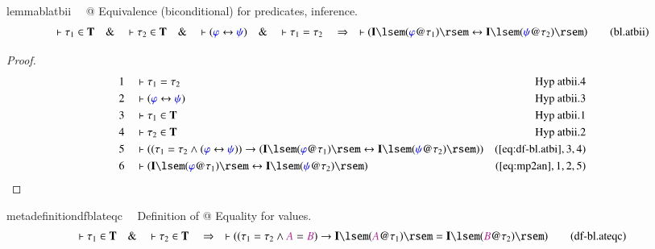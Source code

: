 \begin{restatable}{lemma}{blatbii}~~ @ Equivalence (biconditional) for
predicates, inference.
\begin{align}
\vdash \tau_1 \in \mathbf{T}\quad\&\quad \vdash \tau_2 \in
    \mathbf{T}\quad\&\quad \vdash ( \mw{\varphi} \leftrightarrow \mw{\psi}
    )\quad\&\quad \vdash \tau_1 = \tau_2\quad\Rightarrow\quad \vdash (
    \mathbf{I} \lsem ( \mw{\varphi} @ \tau_1 ) \rsem \leftrightarrow \mathbf{I}
    \lsem ( \mw{\psi} @ \tau_2 ) \rsem )\label{eq:bl.atbii}\tag{bl.atbii}
\end{align}
\end{restatable}

\begin{proof}
\begin{align}
  1 &&  & \vdash \tau_1 = \tau_2&\text{Hyp~atbii.4}\notag%
  \\ 2 &&  & \vdash ( \mw{\varphi} \leftrightarrow \mw{\psi}
      )&\text{Hyp~atbii.3}\notag%
  \\ 3 &&  & \vdash \tau_1 \in \mathbf{T}&\text{Hyp~atbii.1}\notag%
  \\ 4 &&  & \vdash \tau_2 \in \mathbf{T}&\text{Hyp~atbii.2}\notag%
  \\ 5 &&  & \vdash ( ( \tau_1 = \tau_2 \wedge ( \mw{\varphi} \leftrightarrow
      \mw{\psi} ) ) \rightarrow ( \mathbf{I} \lsem (
      \mw{\varphi} @ \tau_1 ) \rsem \leftrightarrow
      \mathbf{I} \lsem ( \mw{\psi} @ \tau_2 ) \rsem )
      )&(\mbox{\ref{eq:df-bl.atbi}},3,4)\notag
  \\ 6 &&  & \vdash ( \mathbf{I} \lsem ( \mw{\varphi} @ \tau_1 ) \rsem
      \leftrightarrow \mathbf{I} \lsem ( \mw{\psi} @ \tau_2
      ) \rsem )&(\mbox{\ref{eq:mp2an}},1,2,5)\notag
\end{align}
\end{proof}

\begin{restatable}{metadefinition}{dfblateqc}~~ Definition of @ Equality for values.
\begin{align}
\vdash \tau_1 \in \mathbf{T}\quad\&\quad \vdash \tau_2 \in
    \mathbf{T}\quad\Rightarrow\quad \vdash ( ( \tau_1 = \tau_2 \wedge \mc{A} =
    \mc{B} ) \rightarrow \mathbf{I} \lsem ( \mc{A} @ \tau_1 ) \rsem =
    \mathbf{I} \lsem ( \mc{B} @ \tau_2 ) \rsem
    )\label{eq:df-bl.ateqc}\tag{df-bl.ateqc}
\end{align}
\end{restatable}

